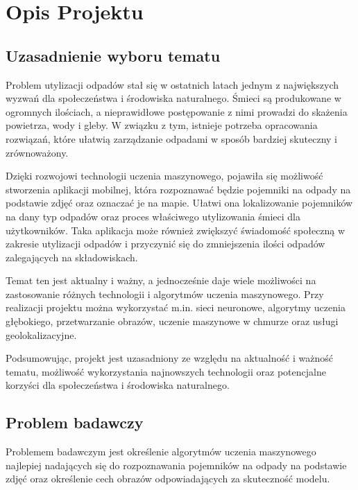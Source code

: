 \documentclass[12pt, a4paper, twoside, openany]{book}
\newcommand{\forceindent}{\leavevmode{\parindent=1.3em\indent}}
\begin{document}
\section{Opis Projektu}

\subsection{Uzasadnienie wyboru tematu}

\forceindent Problem utylizacji odpadów stał się w ostatnich latach jednym z największych wyzwań dla społeczeństwa i środowiska naturalnego. Śmieci są produkowane w ogromnych ilościach, a nieprawidłowe postępowanie z nimi prowadzi do skażenia powietrza, wody i gleby. W związku z tym, istnieje potrzeba opracowania rozwiązań, które ułatwią zarządzanie odpadami w sposób bardziej skuteczny i zrównoważony.

Dzięki rozwojowi technologii uczenia maszynowego, pojawiła się możliwość stworzenia aplikacji mobilnej, która rozpoznawać będzie pojemniki na odpady na podstawie zdjęć oraz oznaczać je na mapie. Ułatwi ona lokalizowanie pojemników na dany typ odpadów oraz proces właściwego utylizowania śmieci dla użytkowników. Taka aplikacja może również zwiększyć świadomość społeczną w zakresie utylizacji odpadów i przyczynić się do zmniejszenia ilości odpadów zalegających na składowiskach.

Temat ten jest aktualny i ważny, a jednocześnie daje wiele możliwości na zastosowanie różnych technologii i algorytmów uczenia maszynowego. Przy realizacji projektu można wykorzystać m.in. sieci neuronowe, algorytmy uczenia głębokiego, przetwarzanie obrazów, uczenie maszynowe w chmurze oraz usługi geolokalizacyjne.

Podsumowując, projekt \topic jest uzasadniony ze względu na aktualność i ważność tematu, możliwość wykorzystania najnowszych technologii oraz potencjalne korzyści dla społeczeństwa i środowiska naturalnego.

\subsection{Problem badawczy}

\forceindent Problemem badawczym jest określenie algorytmów uczenia maszynowego najlepiej nadających się do rozpoznawania pojemników na odpady na podstawie zdjęć oraz określenie cech obrazów odpowiadających za skuteczność modelu.
\end{document}
